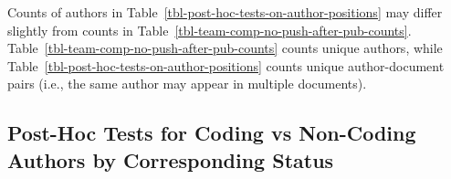 \documentclass[
  letterpaper,
  DIV=11,
  numbers=noendperiod]{scrartcl}
\begin{document}
Counts of authors in Table~\ref{tbl-post-hoc-tests-on-author-positions}
may differ slightly from counts in
Table~\ref{tbl-team-comp-no-push-after-pub-counts}.
Table~\ref{tbl-team-comp-no-push-after-pub-counts} counts unique
authors, while Table~\ref{tbl-post-hoc-tests-on-author-positions} counts
unique author-document pairs (i.e., the same author may appear in
multiple documents).

\subsection{Post-Hoc Tests for Coding vs Non-Coding Authors by
Corresponding
Status}\label{post-hoc-tests-for-coding-vs-non-coding-authors-by-corresponding-status}

\begin{table}

\caption{\label{tbl-post-hoc-tests-on-corresponding-status}Counts of Code-Contributing Authors ('Coding') and Total Authors by Corresponding Status and Bonferroni Corrected p-values from Post-Hoc Binomial Tests. Significant p-values are indicated with asterisks: p < 0.05 (*), p < 0.01 (**), p < 0.001 (***).}

\centering{

\centering
\small


}
\end{table}
\end{document}
